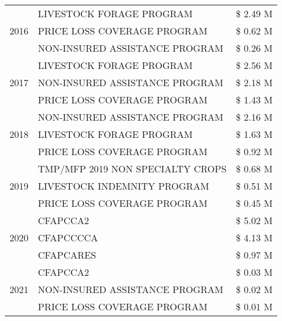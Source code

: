 \begin{tabular}{llr}
\cline{1-3}
\multirow[t]{3}{*}{2016} & LIVESTOCK FORAGE PROGRAM & \$ 2.49 M \\
 & PRICE LOSS COVERAGE PROGRAM & \$ 0.62 M \\
 & NON-INSURED ASSISTANCE PROGRAM & \$ 0.26 M \\
\cline{1-3}
\multirow[t]{3}{*}{2017} & LIVESTOCK FORAGE PROGRAM & \$ 2.56 M \\
 & NON-INSURED ASSISTANCE PROGRAM & \$ 2.18 M \\
 & PRICE LOSS COVERAGE PROGRAM & \$ 1.43 M \\
\cline{1-3}
\multirow[t]{3}{*}{2018} & NON-INSURED ASSISTANCE PROGRAM & \$ 2.16 M \\
 & LIVESTOCK FORAGE PROGRAM & \$ 1.63 M \\
 & PRICE LOSS COVERAGE PROGRAM & \$ 0.92 M \\
\cline{1-3}
\multirow[t]{3}{*}{2019} & TMP/MFP 2019 NON SPECIALTY CROPS & \$ 0.68 M \\
 & LIVESTOCK INDEMNITY PROGRAM & \$ 0.51 M \\
 & PRICE LOSS COVERAGE PROGRAM & \$ 0.45 M \\
\cline{1-3}
\multirow[t]{3}{*}{2020} & CFAPCCA2 & \$ 5.02 M \\
 & CFAPCCCCA & \$ 4.13 M \\
 & CFAPCARES & \$ 0.97 M \\
\cline{1-3}
\multirow[t]{3}{*}{2021} & CFAPCCA2 & \$ 0.03 M \\
 & NON-INSURED ASSISTANCE PROGRAM & \$ 0.02 M \\
 & PRICE LOSS COVERAGE PROGRAM & \$ 0.01 M \\
\cline{1-3}
\bottomrule
\end{tabular}
